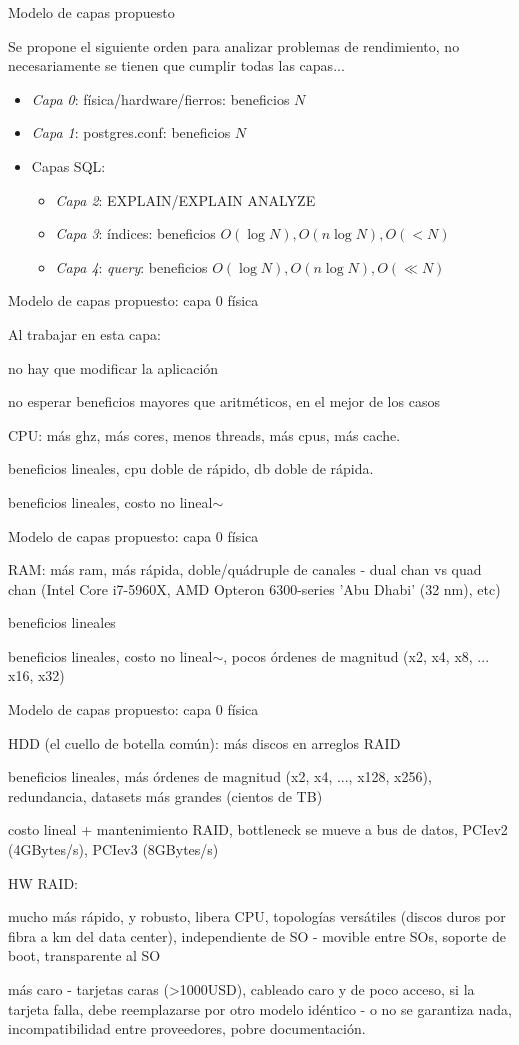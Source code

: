 \documentclass[11pt,spanish]{article}
\newcommand{\rowsp}[1][1em]{\vspace{#1}}
\newcommand{\hone}[1]{{\rowsp[0.3em]\noindent\Large #1 \rowsp[0.3em]}}
\newcommand{\myitm}[1]{\begin{itemize}#1\end{itemize}}
\newcommand{\mydesc}[1]{%
	\begin{description}
	\setlength\itemsep{0em}%
	#1
	\end{description}
}
\newcommand{\pros}{\item[pros:]}
\newcommand{\cons}{\item[cons:]}
\begin{document}
\newpage %
\hone{Modelo de capas propuesto}

Se propone el siguiente orden para analizar problemas de rendimiento,
no necesariamente se tienen que cumplir todas las capas...

\myitm{
	\item \emph{Capa 0}: física/hardware/fierros: beneficios $N$
	\item \emph{Capa 1}: postgres.conf: beneficios $N$
	\item Capas SQL:
	\myitm{
		\item \emph{Capa 2}: EXPLAIN/EXPLAIN ANALYZE
		\item \emph{Capa 3}: índices: beneficios 
			$O(\log N), O(n \log N), O(<N)$
		\item \emph{Capa 4}: \emph{query}: beneficios
			$O(\log N), O(n \log N), O(\ll N)$
	}
}

\newpage %
\hone{Modelo de capas propuesto: capa 0 física}

Al trabajar en esta capa:
\mydesc{\pros no hay que modificar la aplicación
	\cons no esperar beneficios mayores que aritméticos,
		en el mejor de los casos}

\mydesc{
	\item[CPU:] más ghz, más cores, menos threads, más cpus, más cache.
	\mydesc{
		\pros beneficios lineales, cpu doble de rápido, db doble de rápida.
		\cons beneficios lineales, costo no lineal$\sim$
	}
}

\newpage %
\hone{Modelo de capas propuesto: capa 0 física}
\mydesc{
	\item[RAM:] más ram, más rápida, doble/quádruple de canales - dual chan vs quad
			chan (Intel Core i7-5960X,
				AMD Opteron 6300-series 'Abu Dhabi' (32 nm), etc)
	\mydesc{
		\pros beneficios lineales
		\cons beneficios lineales, costo no lineal$\sim$, pocos
			órdenes de magnitud (x2, x4, x8, ... x16, x32)
	}
}


\newpage %
\hone{Modelo de capas propuesto: capa 0 física}

\mydesc{
	\item[HDD (el cuello de botella común):] más discos en arreglos RAID
	\mydesc{\pros beneficios lineales, más órdenes de magnitud
		(x2, x4, ..., x128, x256), redundancia, datasets más grandes
		(cientos de TB)
		\cons costo lineal + mantenimiento RAID, bottleneck se mueve a 
			bus de datos, PCIev2 (4GBytes/s), PCIev3 (8GBytes/s)
	}
	\item[HW RAID:]
		\mydesc{\pros mucho más rápido, y robusto, libera CPU,
		topologías versátiles (discos duros por fibra a km del data
		center), independiente de SO - movible entre SOs,
			soporte de boot, transparente al SO
			\cons más caro - tarjetas caras (>1000USD), cableado caro y de poco 
				acceso, si la tarjeta falla, debe reemplazarse 
				por otro modelo idéntico - o no se garantiza
				nada, incompatibilidad entre proveedores,
				pobre documentación.
		}

}
		
\end{document}
